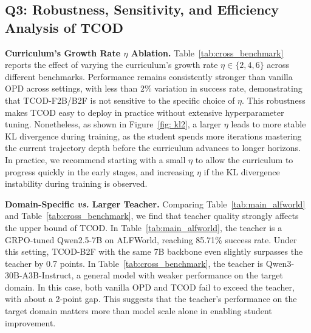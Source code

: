 \documentclass{article} %
\newcommand{\ours}{TCOD\xspace}
\begin{document}


\subsection{$\mathbf{Q3}$: Robustness, Sensitivity, and Efficiency Analysis of \ours}
\label{sec: ablation}

\textbf{Curriculum’s Growth Rate $\eta$ Ablation.}
Table~\ref{tab:cross_benchmark} reports the effect of varying the curriculum’s growth rate $\eta \in \{2, 4, 6\}$ across different benchmarks. 
Performance remains consistently stronger than vanilla OPD across settings, with less than 2\% variation in success rate, demonstrating that \ours-F2B/B2F is not sensitive to the specific choice of $\eta$. 
This robustness makes \ours easy to deploy in practice without extensive hyperparameter tuning.
Nonetheless, as shown in Figure~\ref{fig: kl2}, a larger $\eta$ leads to more stable KL divergence during training, as the student spends more iterations mastering the current trajectory depth before the curriculum advances to longer horizons. 
In practice, we recommend starting with a small $\eta$ to allow the curriculum to progress quickly in the early stages, and increasing $\eta$ if the KL divergence instability during training is observed.

\textbf{Domain-Specific \textit{vs.} Larger Teacher.}
Comparing Table~\ref{tab:main_alfworld} and Table~\ref{tab:cross_benchmark}, we find that teacher quality strongly affects the upper bound of \ours.
In Table~\ref{tab:main_alfworld}, the teacher is a GRPO-tuned Qwen2.5-7B on ALFWorld, reaching 85.71\% success rate. Under this setting, \ours-B2F with the same 7B backbone even slightly surpasses the teacher by 0.7 points.
In Table~\ref{tab:cross_benchmark}, the teacher is Qwen3-30B-A3B-Instruct, a general model with weaker performance on the target domain. In this case, both vanilla OPD and \ours fail to exceed the teacher, with about a 2-point gap.
This suggests that the teacher’s performance on the target domain matters more than model scale alone in enabling student improvement.
\end{document}

